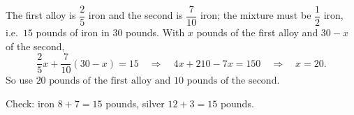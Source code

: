 The first alloy is $\dfrac{2}{5}$ iron and the second is $\dfrac{7}{10}$ iron; the mixture must be $\dfrac{1}{2}$ iron, i.e.\ $15$ pounds of iron in $30$ pounds. With $x$ pounds of the first alloy and $30-x$ of the second,
\[
\dfrac{2}{5}x+\dfrac{7}{10}(30-x)=15\quad\Longrightarrow\quad 4x+210-7x=150\quad\Longrightarrow\quad x=20 .
\]
So use $\boxed{20\text{ pounds of the first alloy and }10\text{ pounds of the second}}$.

Check: iron $8+7=15$ pounds, silver $12+3=15$ pounds.

